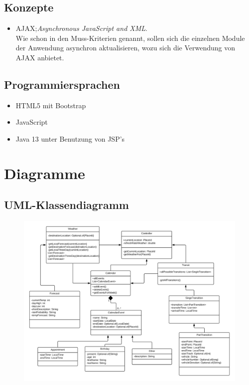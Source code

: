 \documentclass[12pt]{article}
\begin{document}
\subsection*{Konzepte}
\begin{itemize}
\item{AJAX;\quad \textit{Asynchronous JavaScript and XML}.}\\
\newline
Wie schon in den Muss-Kriterien genannt, sollen sich die einzelnen Module der Anwendung asynchron aktualisieren, wozu sich die Verwendung von AJAX anbietet.
\end{itemize}
\subsection*{Programmiersprachen}
\begin{itemize}
\item{HTML5 mit Bootstrap}
\item{JavaScript}
\item{Java 13 unter Benutzung von JSP's}

\end{itemize}

\newpage
\section{Diagramme}
\subsection*{UML-Klassendiagramm}
\begin{figure}[h]
	\includegraphics[width=1.1\textwidth,left]{CalendarUMLReformatted.png}
\end{figure}
\newpage
\end{document}
